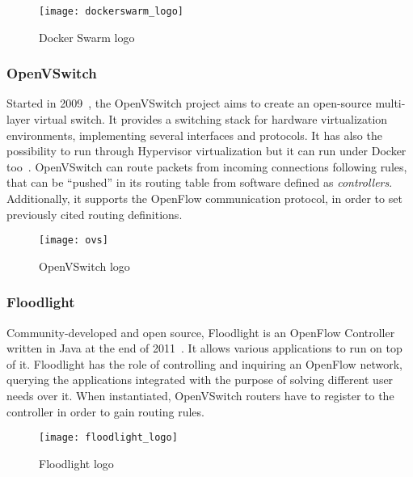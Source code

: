 \begin{figure}[h]
  \centering
  \texttt{[image: dockerswarm\_logo]}
  \caption[Docker Swarm logo]{Docker Swarm logo}
\end{figure}

\subsubsection{OpenVSwitch}
Started in 2009~\cite{ovsGit}, the OpenVSwitch project aims to create an
open-source multi-layer virtual switch. It provides a switching stack for
hardware virtualization environments, implementing several interfaces and
protocols. It has also the possibility to run through Hypervisor virtualization
but it can run under Docker too~\cite{ovsDocker}. OpenVSwitch can route packets
from incoming connections following rules, that can be ``pushed'' in its routing
table from software defined as \textit{controllers}. Additionally, it supports
the OpenFlow communication protocol, in order to set previously cited routing
definitions.

\begin{figure}[h]
  \centering
  \texttt{[image: ovs]}
  \caption[OpenVSwitch logo]{OpenVSwitch logo}
\end{figure}

\subsubsection{Floodlight}
\label{chap:prjan:sec:tech:sub:other:sub:floodlight}
Community-developed and open source, Floodlight is an OpenFlow Controller
written in Java at the end of 2011~\cite{floodlightGit}. It allows various
applications to run on top of it. Floodlight has the role of controlling and
inquiring an OpenFlow network, querying the applications integrated with the
purpose of solving different user needs over it. When instantiated, OpenVSwitch
routers have to register to the controller in order to gain routing rules.

\begin{figure}[h]
  \centering
  \texttt{[image: floodlight\_logo]}
  \caption[Floodlight logo]{Floodlight logo}
\end{figure}

